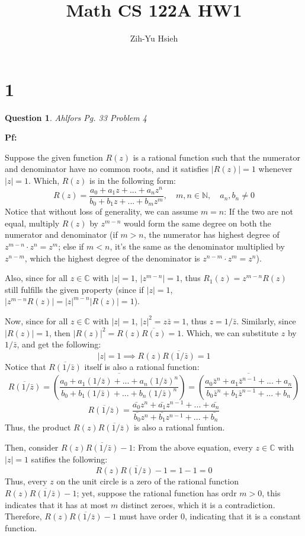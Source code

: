 \documentclass{article}
\title{Math CS 122A HW1}
\author{Zih-Yu Hsieh}
\newtheorem{question}{Question}
\begin{document}
\maketitle

\section*{1}
\begin{question}
    Ahlfors Pg. 33 Problem 4
\end{question}

\textbf{Pf:}

Suppose the given function $R(z)$ is a rational function such that the numerator and denominator have no common roots, and it satisfies $|R(z)|=1$ whenever $|z|=1$. 
Which, $R(z)$ is in the following form:
$$R(z)=\frac{a_0+a_1z+...+a_nz^n}{b_0+b_1z+...+b_mz^m},\quad m,n\in\mathbb{N},\quad a_n,b_n\neq 0$$
Notice that without loss of generality, we can assume $m=n$: If the two are not equal, multiply $R(z)$ by $z^{m-n}$ would form the 
same degree on both the numerator and denominator (if $m>n$, the numerator has highest degree of $z^{m-n}\cdot z^n=z^m$; else if $m<n$, 
it's the same as the denominator multiplied by $z^{n-m}$, which the highest degree of the denominator is $z^{n-m}\cdot z^m=z^n$).

Also, since for all $z\in\mathbb{C}$ with $|z|=1$, $|z^{m-n}|=1$, thus $R_1(z)=z^{m-n}R(z)$
still fulfills the given property (since if $|z|=1$, $|z^{m-n}R(z)|=|z|^{m-n}|R(z)|=1$).

\hfill

Now, since for all $z\in\mathbb{C}$ with $|z|=1$, $|z|^2=z\bar{z}=1$, thus $z=1/\bar{z}$. Similarly, since $|R(z)|=1$, then 
$|R(z)|^2=R(z)\overline{R(z)}=1$. Which, we can substitute $z$ by $1/\bar{z}$, and get the following:
$$|z|=1\implies R(z)\overline{R(1/\bar{z})}=1$$
Notice that $\overline{R(1/\bar{z})}$ itself is also a rational function:
$$\overline{R(1/\bar{z})}=\overline{\left(\frac{a_0+a_1(1/\bar{z})+...+a_n(1/\bar{z})^n}{b_0+b_1(1/\bar{z})+...+b_n(1/\bar{z})^n}\right)} = \overline{\left(\frac{a_0\bar{z}^n+a_1\bar{z}^{n-1}+...+a_n}{b_0\bar{z}^n+b_1\bar{z}^{n-1}+...+b_n}\right)}$$
$$\overline{R(1/\bar{z})}=\frac{\bar{a_0}z^n+\bar{a_1}z^{n-1}+...+\bar{a_n}}{\bar{b_0}z^n+\bar{b_1}z^{n-1}+...+\bar{b_n}}$$
Thus, the product $R(z)\overline{R(1/\bar{z})}$ is also a rational funtion.

\hfill

Then, consider $R(z)\overline{R(1/\bar{z})}-1$: From the above equation, every $z\in\mathbb{C}$ with $|z|=1$ satifies the following:
$$R(z)\overline{R(1/\bar{z})}-1=1-1=0$$
Thus, every $z$ on the unit circle is a zero of the rational function $R(z)\overline{R(1/\bar{z})}-1$; yet, suppose the rational function has ordr $m>0$, this indicates that
it has at most $m$ distinct zeroes, which it is a contradiction. Therefore, $R(z)\overline{R(1/\bar{z})}-1$ must have order $0$, indicating that it is a constant function.
\end{document}
